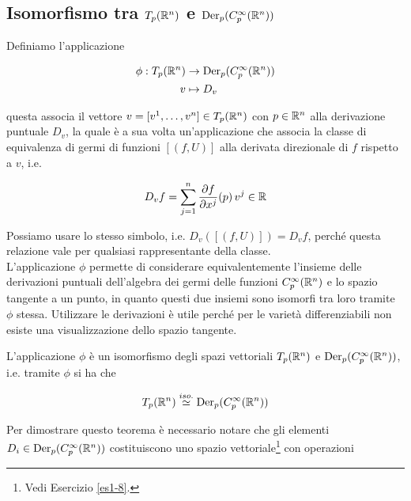 \subsection{Isomorfismo tra $ T_{p}(\mathbb{R}^{n}) $ e $ \operatorname{Der}_{p}(C_{p}^{\infty}(\mathbb{R}^{n})) $}

Definiamo l'applicazione

\begin{align}
	\begin{split}
		\phi : T_{p}(\mathbb{R}^{n}) &\to \operatorname{Der}_{p}(C_{p}^{\infty}(\mathbb{R}^{n}))\\
		v &\mapsto D_{v}
	\end{split}
\end{align}

questa associa il vettore $ v = [v^{1},\dots,v^{n}] \in T_{p}(\mathbb{R}^{n}) $ con $ p \in \mathbb{R}^{n} $ alla derivazione puntuale $ D_{v} $, la quale è a sua volta un'applicazione che associa la classe di equivalenza di germi di funzioni $ [(f,U)] $ alla derivata direzionale di $ f $ rispetto a $ v $, i.e.

\begin{align}
	D_{v} f = \sum_{j=1}^{n} \dfrac{\partial f}{\partial x^{j}} (p) \, v^{j} \in \mathbb{R}
\end{align}

Possiamo usare lo stesso simbolo, i.e. $ D_{v} ([(f,U)]) = D_{v} f $, perché questa relazione vale per qualsiasi rappresentante della classe.\\
L'applicazione $ \phi $ permette di considerare equivalentemente l'insieme delle derivazioni puntuali dell'algebra dei germi delle funzioni $ C_{p}^{\infty}(\mathbb{R}^{n}) $ e lo spazio tangente a un punto, in quanto questi due insiemi sono isomorfi tra loro tramite $ \phi $ stessa. Utilizzare le derivazioni è utile perché per le varietà differenziabili non esiste una visualizzazione dello spazio tangente.

\begin{theorem}
	L'applicazione $ \phi $ è un isomorfismo degli spazi vettoriali $ T_{p}(\mathbb{R}^{n}) $ e $ \operatorname{Der}_{p}(C_{p}^{\infty}(\mathbb{R}^{n})) $, i.e. tramite $ \phi $ si ha che
	
	\begin{equation}
		T_{p}(\mathbb{R}^{n}) \stackrel{iso.}{\simeq} \operatorname{Der}_{p}(C_{p}^{\infty}(\mathbb{R}^{n}))
	\end{equation}
\end{theorem}

Per dimostrare questo teorema è necessario notare che gli elementi $ D_{i} \in \operatorname{Der}_{p}(C_{p}^{\infty}(\mathbb{R}^{n})) $ costituiscono uno spazio vettoriale\footnote{%
	Vedi Esercizio \ref{es1-8}.%
} con operazioni

